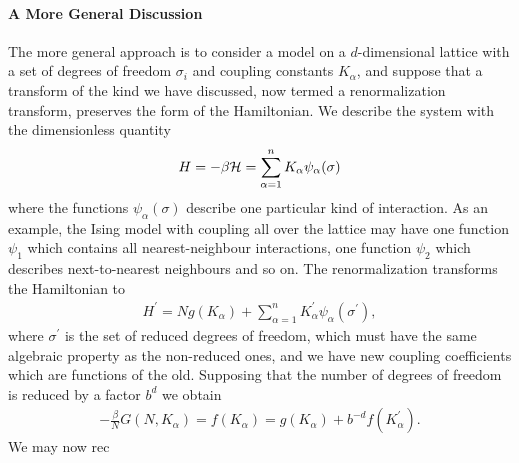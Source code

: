 \paragraph{A More General Discussion}
The more general approach is to consider a model on a $d$-dimensional lattice with a set of degrees of freedom $\sigma_{i}$ and coupling constants $K_{\alpha}$, and suppose that a transform of the kind we have discussed, now termed a renormalization transform, preserves the form of the Hamiltonian. We describe the system with the dimensionless quantity
\begin{align*}
	H = -\beta\mathcal{H} = \sum\limits_{\alpha = 1}^{n}K_{\alpha}\psi_{\alpha}(\sigma)
\end{align*}
where the functions $\psi_{\alpha}(\sigma)$ describe one particular kind of interaction. As an example, the Ising model with coupling all over the lattice may have one function $\psi_{1}$ which contains all nearest-neighbour interactions, one function $\psi_{2}$ which describes next-to-nearest neighbours and so on. The renormalization transforms the Hamiltonian to
\begin{align*}
	H^{\prime} = Ng(K_{\alpha}) + \sum\limits_{\alpha = 1}^{n}K_{\alpha}^{\prime}\psi_{\alpha}(\sigma^{\prime}),
\end{align*}
where $\sigma^{\prime}$ is the set of reduced degrees of freedom, which must have the same algebraic property as the non-reduced ones, and we have new coupling coefficients which are functions of the old. Supposing that the number of degrees of freedom is reduced by a factor $b^{d}$ we obtain
\begin{align*}
	-\frac{\beta}{N}G\left(N, K_{\alpha}\right) = f\left(K_{\alpha}\right) = g(K_{\alpha}) + b^{-d}f\left(K_{\alpha}^{\prime}\right).
\end{align*}
We may now rec